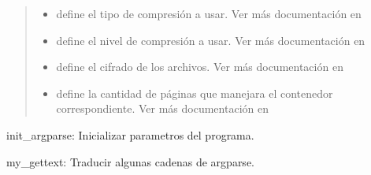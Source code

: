 \documentclass[a4paper,12pt,spanish]{sphinxmanual}
\begin{document}
\begin{quote}
\begin{itemize}
\begin{description}
\begin{itemize}
\item {} 
 define el tipo de compresión a usar. Ver más documentación en {\hyperref[\detokenize{openerm.Compressor:module-openerm.Compressor}]{}}

\item {} 
 define el nivel de compresión a usar. Ver más documentación en {\hyperref[\detokenize{openerm.Compressor:module-openerm.Compressor}]{}}

\item {} 
 define el cifrado de los archivos. Ver más documentación en {\hyperref[\detokenize{openerm.Cipher:module-openerm.Cipher}]{}}

\item {} 
 define la cantidad de páginas que manejara el contenedor correspondiente. Ver más documentación en 

\end{itemize}

\end{description}

\end{itemize}
\end{quote}

\begin{fulllineitems}
\label{\detokenize{spl2oerm:spl2oerm.init_argparse}}
init\_argparse: Inicializar parametros del programa.

\end{fulllineitems}


\begin{fulllineitems}
\label{\detokenize{spl2oerm:spl2oerm.my_gettext}}
my\_gettext: Traducir algunas cadenas de argparse.

\end{fulllineitems}
\end{document}
